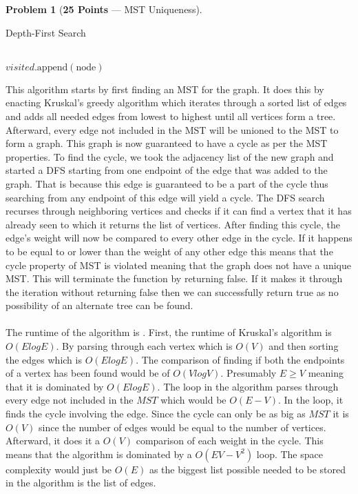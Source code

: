 \documentclass[11pt]{article}
\theoremstyle{definition}
\theoremstyle{theorem}
\newtheorem{prob}{Problem}
\begin{document}
\begin{prob}[\textbf{25 Points} --- MST Uniqueness]
\begin{enumerate}
\begin{algorithm}[H]
\caption{Depth-First Search}
 \\ {
    $visited.\text{append}(\text{node})$\;
}
\end{algorithm}
    \end{enumerate}
\end{prob}

\newpage

This algorithm starts by first finding an MST for the graph. It does this by enacting Kruskal's greedy algorithm which iterates through a sorted list of edges and adds all needed edges from lowest to highest until all vertices form a tree. Afterward, every edge not included in the MST will be unioned to the MST to form a graph. This graph is now guaranteed to have a cycle as per the MST properties. To find the cycle, we took the adjacency list of the new graph and started a DFS starting from one endpoint of the edge that was added to the graph. That is because this edge is guaranteed to be a part of the cycle thus searching from any endpoint of this edge will yield a cycle. The DFS search recurses through neighboring vertices and checks if it can find a vertex that it has already seen to which it returns the list of vertices. After finding this cycle, the edge's weight will now be compared to every other edge in the cycle. If it happens to be equal to or lower than the weight of any other edge this means that the cycle property of MST is violated meaning that the graph does not have a unique MST. This will terminate the function by returning false. If it makes it through the iteration without returning false then we can successfully return true as no possibility of an alternate tree can be found.\\\\
The runtime of the algorithm is . First, the runtime of Kruskal's algorithm is $O(E log E)$. By parsing through each vertex which is $O(V)$ and then sorting the edges which is $O(E log E)$. The comparison of finding if both the endpoints of a vertex has been found would be of $O(V log V)$. Presumably $E \ge V$ meaning that it is dominated by $O(E log E)$. The loop in the algorithm parses through every edge not included in the $MST$ which would be $O(E - V)$. In the loop, it finds the cycle involving the edge. Since the cycle can only be as big as $MST$ it is $O(V)$ since the number of edges would be equal to the number of vertices. Afterward, it does it a $O(V)$ comparison of each weight in the cycle. This means that the algorithm is dominated by a $O(EV - V^{2})$ loop. The space complexity would just be $O(E)$ as the biggest list possible needed to be stored in the algorithm is the list of edges.
\end{document}
